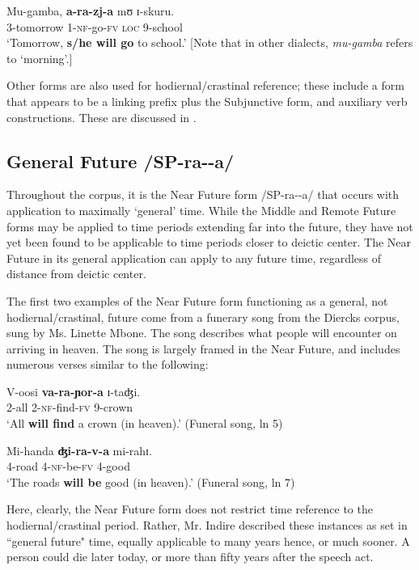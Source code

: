 \documentclass[output=paper]{langsci/langscibook}
\begin{document}
\ea\label{ex:sarvasy:1}
\gll Mu-gamba,   \textbf{a-ra-zj-a}   mʊ  ɪ-skuru. \\
3-tomorrow  1-\textsc{nf}-go-\textsc{fv}  \textsc{loc}  9-school \\
\glt ‘Tomorrow, \textbf{s/he will go} to school.’ [Note that in other dialects, \textit{mu-gamba} refers to ‘morning’.] \z

Other forms are also used for hodiernal/crastinal reference; these include a form that appears to be a linking prefix plus the Subjunctive form, and auxiliary verb constructions. These are discussed in .

\subsection{General Future /SP-ra-{\longrule}-a/}
\label{sec:sarvasy:3.2}

Throughout the corpus, it is the Near Future form /SP-ra-{\longrule}-a/ that occurs with application to maximally ‘general’ time. While the Middle and Remote Future forms may be applied to time periods extending far into the future, they have not yet been found to be applicable to time periods closer to deictic center. The Near Future in its general application can apply to any future time, regardless of distance from deictic center. 

The first two examples of the Near Future form functioning as a general, not hodiernal/crastinal, future come from a funerary song from the Diercks corpus, sung by Ms. Linette Mbone. The song describes what people will encounter on arriving in heaven. The song is largely framed in the Near Future, and includes numerous verses similar to the following:

\ea\label{ex:sarvasy:2}
\gll V-oosi   \textbf{va-ra-ɲor-a}     ɪ-taʤi. \\
2-all 2-\textsc{nf}-find-\textsc{fv}    9-crown \\
\glt ‘All \textbf{will find} a crown (in heaven).’ (Funeral song, ln 5)
\z

\ea\label{ex:sarvasy:3}
\gll Mi-handa   \textbf{ʤi-ra-v-a}   mi-rahɪ. \\
4-road 4-\textsc{nf}-be-\textsc{fv} 4-good \\
\glt ‘The roads \textbf{will be} good (in heaven).’ (Funeral song, ln 7)
\z

Here, clearly, the Near Future form does not restrict time reference to the hodiernal/crastinal period. Rather, Mr. Indire described these instances as set in ``general future" time, equally applicable to many years hence, or much sooner. A person could die later today, or more than fifty years after the speech act.
\end{document}

